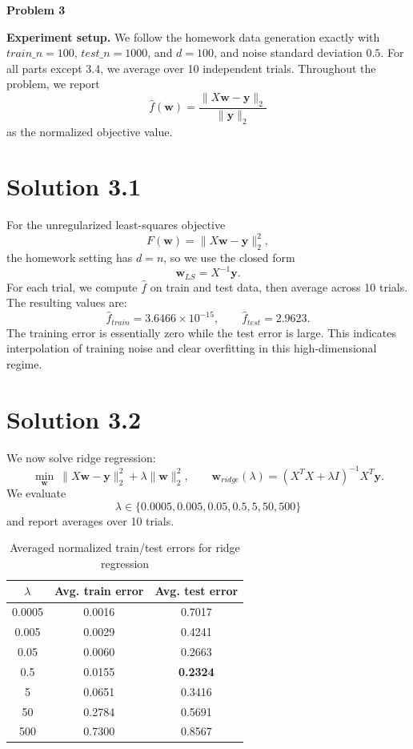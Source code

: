 ﻿\documentclass[12pt]{article}
\begin{document}
\begin{center}
{\LARGE \textbf{Problem 3}}
\end{center}
\vspace{0.5em}

\noindent\textbf{Experiment setup.} We follow the homework data generation exactly with
\(train\_n=100\), \(test\_n=1000\), and \(d=100\), and noise standard deviation \(0.5\).
For all parts except 3.4, we average over 10 independent trials. Throughout the problem, we report
\[
\hat f(\mathbf w)=\frac{\|X\mathbf w-\mathbf y\|_2}{\|\mathbf y\|_2}
\]
as the normalized objective value.

\section*{Solution 3.1}
For the unregularized least-squares objective
\[
F(\mathbf w)=\|X\mathbf w-\mathbf y\|_2^2,
\]
the homework setting has \(d=n\), so we use the closed form
\[
\mathbf w_{LS}=X^{-1}\mathbf y.
\]
For each trial, we compute \(\hat f\) on train and test data, then average across 10 trials. The resulting values are:
\[
\hat f_{train}=3.6466\times 10^{-15},
\qquad
\hat f_{test}=2.9623.
\]
The training error is essentially zero while the test error is large. This indicates interpolation of training noise and clear overfitting in this high-dimensional regime.

\section*{Solution 3.2}
We now solve ridge regression:
\[
\min_{\mathbf w}\ \|X\mathbf w-\mathbf y\|_2^2+\lambda\|\mathbf w\|_2^2,
\qquad
\mathbf w_{ridge}(\lambda)=(X^TX+\lambda I)^{-1}X^T\mathbf y.
\]
We evaluate
\[
\lambda\in\{0.0005,0.005,0.05,0.5,5,50,500\}
\]
and report averages over 10 trials.

\begin{table}[H]
\centering
\caption{Averaged normalized train/test errors for ridge regression}
\begin{tabular}{ccc}
\toprule
$\lambda$ & Avg. train error & Avg. test error \\
\midrule
0.0005 & 0.0016 & 0.7017 \\
0.005  & 0.0029 & 0.4241 \\
0.05   & 0.0060 & 0.2663 \\
0.5    & 0.0155 & \textbf{0.2324} \\
5      & 0.0651 & 0.3416 \\
50     & 0.2784 & 0.5691 \\
500    & 0.7300 & 0.8567 \\
\bottomrule
\end{tabular}
\end{table}
\end{document}
